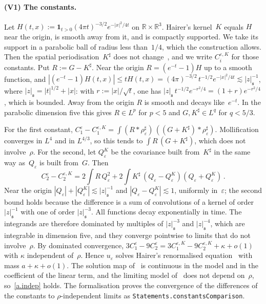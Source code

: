 \documentclass[11pt,letterpaper]{article}
\numberwithin{equation}{section}
\theoremstyle{plain}
\theoremstyle{definition}
\theoremstyle{remark}
\newcommand{\R}{\mathbb{R}}
\newcommand{\nf}[2]{#1/#2}
\newcommand{\1}{\mathbf{1}}
\begin{document}
\paragraph{(V1) The constants.} Let $H(t,x):=\1_{t>0}(4\pi t)^{-\nf{3}{2}}e^{-\nf{|x|^2}{4t}}$ on $\R\times\R^3$. Hairer's kernel~$K$ equals $H$ near the origin, is smooth away from it, and is compactly supported. We take its support in a parabolic ball of radius less than~$\nf{1}{4}$, which the construction allows. Then the spatial periodisation~$K^\sharp$ does not change~\cite[(10.33) and (10.41)]{Hai14}, and we write $C_i^{\varepsilon,K}$ for those constants. Put $R:=G-K^\sharp$. Near the origin $R=(e^{-t}-1)H$ up to a smooth function, and $|(e^{-t}-1)H(t,x)|\le tH(t,x)=(4\pi)^{-\nf{3}{2}}\,t^{-\nf{1}{2}}e^{-\nf{|x|^2}{4t}}\lesssim|z|_{\mathfrak s}^{-1}$, where $|z|_{\mathfrak s}=|t|^{\nf12}+|x|$: with $r:=|x|/\sqrt t$, one has $|z|_{\mathfrak s}\,t^{-\nf12}e^{-\nf{r^2}{4}}=(1+r)e^{-\nf{r^2}{4}}$, which is bounded. Away from the origin $R$ is smooth and decays like~$e^{-t}$. In the parabolic dimension five this gives $R\in L^p$ for $p<5$ and $G,K^\sharp\in L^q$ for $q<\nf{5}{3}$.

For the first constant, $C_1^\varepsilon-C_1^{\varepsilon,K}=\int(R*\rho^\sharp_\varepsilon)\,((G+K^\sharp)*\rho^\sharp_\varepsilon)$. Mollification converges in $L^4$ and in $L^{\nf{4}{3}}$, so this tends to $\int R\,(G+K^\sharp)$, which does not involve~$\rho$. For the second, let $Q^K_\varepsilon$ be the covariance built from~$K^\sharp$ in the same way as~$Q_\varepsilon$ is built from~$G$. Then
\begin{equation*}
C_2^\varepsilon-C_2^{\varepsilon,K}=2\int R\,Q_\varepsilon^2+2\int K^\sharp\,(Q_\varepsilon-Q^K_\varepsilon)(Q_\varepsilon+Q^K_\varepsilon)\,.
\end{equation*}
Near the origin $|Q_\varepsilon|+|Q^K_\varepsilon|\lesssim|z|_{\mathfrak s}^{-1}$ and $|Q_\varepsilon-Q^K_\varepsilon|\lesssim1$, uniformly in~$\varepsilon$; the second bound holds because the difference is a sum of convolutions of a kernel of order $|z|_{\mathfrak s}^{-1}$ with one of order $|z|_{\mathfrak s}^{-3}$. All functions decay exponentially in time. The integrands are therefore dominated by multiples of $|z|_{\mathfrak s}^{-3}$ and $|z|_{\mathfrak s}^{-4}$, which are integrable in dimension five, and they converge pointwise to limits that do not involve~$\rho$. By dominated convergence, $3C_1^\varepsilon-9C_2^\varepsilon=3C_1^{\varepsilon,K}-9C_2^{\varepsilon,K}+\kappa+o(1)$ with $\kappa$ independent of~$\rho$. Hence $u_\varepsilon$ solves Hairer's renormalised equation~\cite[(9.21)]{Hai14} with mass $a+\kappa+o(1)$. The solution map of~\cite[Proposition~9.8]{Hai14} is continuous in the model and in the coefficient of the linear term, and the limiting model of~\cite[Theorem~10.22]{Hai14} does not depend on~$\rho$, so~\ref{a.indep} holds. The formalisation proves the convergence of the differences of the constants to $\rho$-independent limits as \texttt{Statements.constantsComparison}.
\end{document}
